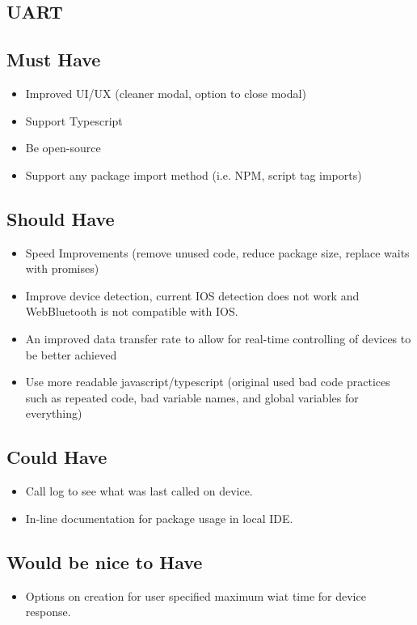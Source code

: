 \documentclass{l4proj}
\begin{document}
\begin{appendices}

\section{UART}
\subsection{Must Have}
\begin{itemize}
    \item Improved UI/UX (cleaner modal, option to close modal)
    \item Support Typescript
    \item Be open-source
    \item Support any package import method (i.e. NPM, script tag imports)
\end{itemize}
\subsection{Should Have}
\begin{itemize}
    \item Speed Improvements (remove unused code, reduce package size, replace waits with promises)
    \item Improve device detection, current IOS detection does not work and WebBluetooth is not compatible with IOS.
    \item An improved data transfer rate to allow for real-time controlling of devices to be better achieved
    \item Use more readable javascript/typescript (original used bad code practices such as repeated code, bad variable names, and global variables for everything)
\end{itemize}
\subsection{Could Have}
\begin{itemize}
    \item Call log to see what was last called on device.
    \item In-line documentation for package usage in local IDE.
\end{itemize}
\subsection{Would be nice to Have}
\begin{itemize}
    \item Options on creation for user specified maximum wiat time for device response.
\end{itemize}


\end{appendices}
\end{document}
